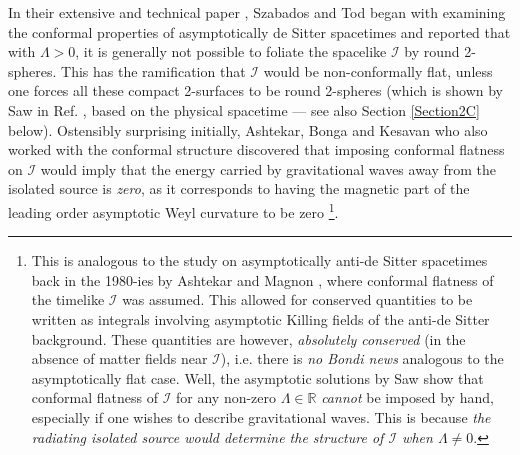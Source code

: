 \documentclass[aps,pre,preprint,superscriptaddress,showpacs,showkeys]{revtex4-1}
\newcommand{\R}{{\mathbb R}}
\begin{document}
In their extensive and technical paper \cite{Szabados}, Szabados and Tod began with examining the conformal properties of asymptotically de Sitter spacetimes and reported that with $\Lambda>0$, it is generally not possible to foliate the spacelike $\mathcal{I}$ by round 2-spheres. This has the ramification that $\mathcal{I}$ would be non-conformally flat, unless one forces all these compact 2-surfaces to be round 2-spheres (which is shown by Saw in Ref. \cite{Vee2016}, based on the physical spacetime --- see also Section \ref{Section2C} below). Ostensibly surprising initially, Ashtekar, Bonga and Kesavan who also worked with the conformal structure \cite{ash1} discovered that imposing conformal flatness on $\mathcal{I}$ would imply that the energy carried by gravitational waves away from the isolated source is \emph{zero}, as it corresponds to having the magnetic part of the leading order asymptotic Weyl curvature to be zero \footnote{This is analogous to the study on asymptotically anti-de Sitter spacetimes back in the 1980-ies by Ashtekar and Magnon \cite{ashmag}, where conformal flatness of the timelike $\mathcal{I}$ was assumed. This allowed for conserved quantities to be written as integrals involving asymptotic Killing fields of the anti-de Sitter background. These quantities are however, \emph{absolutely conserved} (in the absence of matter fields near $\mathcal{I}$), i.e. there is \emph{no Bondi news} analogous to the asymptotically flat case. Well, the asymptotic solutions by Saw \cite{Vee2016,Vee2017} show that conformal flatness of $\mathcal{I}$ for any non-zero $\Lambda\in\R$ \emph{cannot} be imposed by hand, especially if one wishes to describe gravitational waves. This is because \emph{the radiating isolated source would determine the structure of $\mathcal{I}$ when $\Lambda\neq0$}.}.
\end{document}
